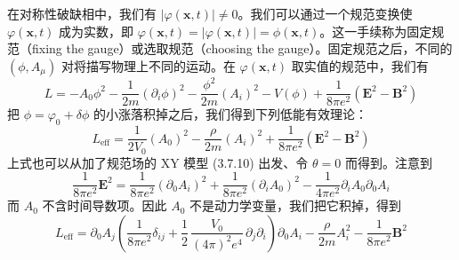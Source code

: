 在对称性破缺相中，我们有 $|\varphi(\pmb{x},t)|\neq0$。我们可以通过一个规范变换使 $\varphi(\pmb{x},t)$ 成为实数，即 $\varphi(\pmb{x},t)=|\varphi(\pmb{x},t)|=\phi(\pmb{x},t)$。这一手续称为固定规范（fixing the gauge）或选取规范（choosing the gauge）。固定规范之后，不同的 $(\phi, A_{\mu})$ 对将描写物理上不同的运动。在 $\varphi(\pmb{x},t)$ 取实值的规范中，我们有
\begin{equation*}
L = -A_{0}\phi^{2} - \frac{1}{2m}(\partial_{i}\phi)^{2} - \frac{\phi^{2}}{2m}(A_{i})^{2} - V(\phi) + \frac{1}{8\pi e^{2}}(\pmb{E}^{2}-\pmb{B}^{2})
\end{equation*}
把 $\phi=\varphi_{0}+\delta\phi$ 的小涨落积掉之后，我们得到下列低能有效理论：
\begin{equation*}
L_{\mathrm{eff}} = \frac{1}{2V_{0}}(A_{0})^{2} - \frac{\rho}{2m}(A_{i})^{2} + \frac{1}{8\pi e^{2}}(\pmb{E}^{2}-\pmb{B}^{2}) \tag{3.7.17}
\end{equation*}
上式也可以从加了规范场的 XY 模型 (3.7.10) 出发、令 $\theta=0$ 而得到。注意到
\begin{equation*}
\frac{1}{8\pi e^{2}}\pmb{E}^{2} = \frac{1}{8\pi e^{2}}(\partial_{0}A_{i})^{2} + \frac{1}{8\pi e^{2}}(\partial_{i}A_{0})^{2} - \frac{1}{4\pi e^{2}}\partial_{i}A_{0}\partial_{0}A_{i}
\end{equation*}
而 $A_{0}$ 不含时间导数项。因此 $A_{0}$ 不是动力学变量，我们把它积掉，得到
\begin{equation*}
L_{\mathrm{eff}} = \partial_{0}A_{j}\left(\frac{1}{8\pi e^{2}}\delta_{ij} + \frac{1}{2}\,\frac{V_{0}}{(4\pi)^{2}e^{4}}\,\partial_{j}\partial_{i}\right)\partial_{0}A_{i} - \frac{\rho}{2m}A_{i}^{2} - \frac{1}{8\pi e^{2}}\pmb{B}^{2}
\end{equation*}

